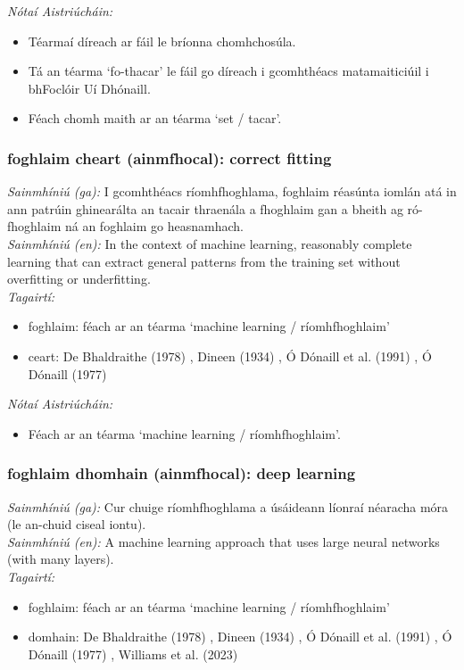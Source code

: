  \noindent \textit{Nótaí Aistriúcháin:}
\begin{itemize}
	\item Téarmaí díreach ar fáil le bríonna chomhchosúla.
	\item Tá an téarma `fo-thacar' le fáil go díreach i gcomhthéacs matamaiticiúil i bhFoclóir Uí Dhónaill.
	\item Féach chomh maith ar an téarma `set / tacar'.
\end{itemize}


\subsubsection*{foghlaim cheart (ainmfhocal): correct fitting}
 \noindent \textit{Sainmhíniú (ga):} I gcomhthéacs ríomhfhoghlama, foghlaim réasúnta iomlán atá in ann patrúin ghinearálta an tacair thraenála a fhoghlaim gan a bheith ag ró-fhoghlaim ná an foghlaim go heasnamhach.
\\
 \noindent \textit{Sainmhíniú (en):} In the context of machine learning, reasonably complete learning that can extract general patterns from the training set without overfitting or underfitting.
\\
 \noindent \textit{Tagairtí:}
\begin{itemize}
	\item foghlaim: féach ar an téarma `machine learning / ríomhfhoghlaim'
	\item ceart: De Bhaldraithe (1978) \cite{de-bhaldraithe}, Dineen (1934) \cite{dineen}, Ó Dónaill et al. (1991) \cite{focloir-beag}, Ó Dónaill (1977) \cite{odonaill}
\end{itemize}

 \noindent \textit{Nótaí Aistriúcháin:}
\begin{itemize}
	\item Féach ar an téarma `machine learning / ríomhfhoghlaim'.
\end{itemize}


\subsubsection*{foghlaim dhomhain (ainmfhocal): deep learning}
 \noindent \textit{Sainmhíniú (ga):} Cur chuige ríomhfhoghlama a úsáideann líonraí néaracha móra (le an-chuid ciseal iontu).
\\
 \noindent \textit{Sainmhíniú (en):} A machine learning approach that uses large neural networks (with many layers).
\\
 \noindent \textit{Tagairtí:}
\begin{itemize}
	\item foghlaim: féach ar an téarma `machine learning / ríomhfhoghlaim'
	\item domhain: De Bhaldraithe (1978) \cite{de-bhaldraithe}, Dineen (1934) \cite{dineen}, Ó Dónaill et al. (1991) \cite{focloir-beag}, Ó Dónaill (1977) \cite{odonaill}, Williams et al. (2023) \cite{storchiste}
\end{itemize}

